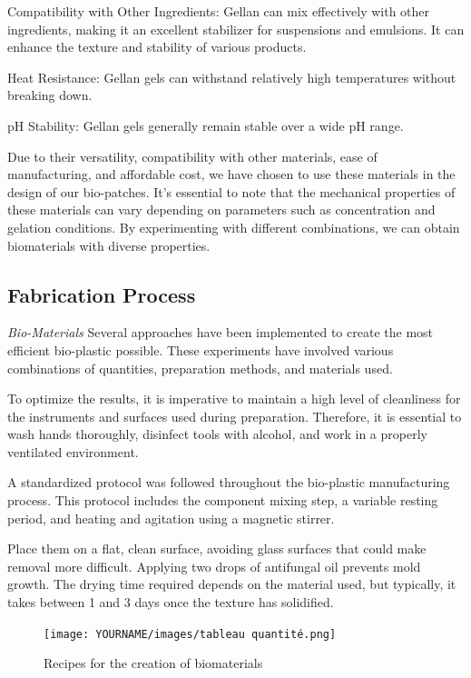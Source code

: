 \item Compatibility with Other Ingredients: Gellan can mix effectively with other ingredients, making it an excellent stabilizer for suspensions and emulsions. It can enhance the texture and stability of various products.

\item Heat Resistance: Gellan gels can withstand relatively high temperatures without breaking down.

\item pH Stability: Gellan gels generally remain stable over a wide pH range.

Due to their versatility, compatibility with other materials, ease of manufacturing, and affordable cost, we have chosen to use these materials in the design of our bio-patches. It’s essential to note that the mechanical properties of these materials can vary depending on parameters such as concentration and gelation conditions. By experimenting with different combinations, we can obtain biomaterials with diverse properties.

\subsection{Fabrication Process}
\textit{Bio-Materials}
Several approaches have been implemented to create the most efficient bio-plastic possible. These experiments have involved various combinations of quantities, preparation methods, and materials used.

To optimize the results, it is imperative to maintain a high level of cleanliness for the instruments and surfaces used during preparation. Therefore, it is essential to wash hands thoroughly, disinfect tools with alcohol, and work in a properly ventilated environment.

A standardized protocol was followed throughout the bio-plastic manufacturing process. This protocol includes the component mixing step, a variable resting period, and heating and agitation using a magnetic stirrer.

Place them on a flat, clean surface, avoiding glass surfaces that could make removal more difficult. Applying two drops of antifungal oil prevents mold growth. The drying time required depends on the material used, but typically, it takes between 1 and 3 days once the texture has solidified.

\begin{figure}[h]
    \centering
    \texttt{[image: YOURNAME/images/tableau quantité.png]}
    \caption{Recipes for the creation of biomaterials}
    \label{}
\end{figure}

